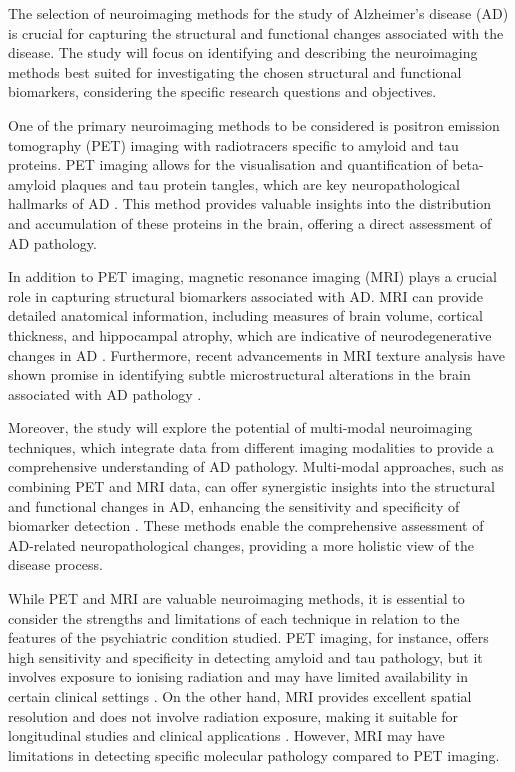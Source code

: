 \documentclass[10pt]{article}
\begin{document}
\begin{sloppypar}
  The selection of neuroimaging methods for the study of Alzheimer's disease (AD) is crucial for capturing the structural and functional changes associated with the disease. The study will focus on identifying and describing the neuroimaging methods best suited for investigating the chosen structural and functional biomarkers, considering the specific research questions and objectives.

  One of the primary neuroimaging methods to be considered is positron emission tomography (PET) imaging with radiotracers specific to amyloid and tau proteins. PET imaging allows for the visualisation and quantification of beta-amyloid plaques and tau protein tangles, which are key neuropathological hallmarks of AD \citep{jack_serial_2009}. This method provides valuable insights into the distribution and accumulation of these proteins in the brain, offering a direct assessment of AD pathology.

  In addition to PET imaging, magnetic resonance imaging (MRI) plays a crucial role in capturing structural biomarkers associated with AD. MRI can provide detailed anatomical information, including measures of brain volume, cortical thickness, and hippocampal atrophy, which are indicative of neurodegenerative changes in AD \citep{cai_magnetic_2020}. Furthermore, recent advancements in MRI texture analysis have shown promise in identifying subtle microstructural alterations in the brain associated with AD pathology \citep{cai_magnetic_2020}.

  Moreover, the study will explore the potential of multi-modal neuroimaging techniques, which integrate data from different imaging modalities to provide a comprehensive understanding of AD pathology. Multi-modal approaches, such as combining PET and MRI data, can offer synergistic insights into the structural and functional changes in AD, enhancing the sensitivity and specificity of biomarker detection \citep{ran_multimodal_2022}. These methods enable the comprehensive assessment of AD-related neuropathological changes, providing a more holistic view of the disease process.

  While PET and MRI are valuable neuroimaging methods, it is essential to consider the strengths and limitations of each technique in relation to the features of the psychiatric condition studied. PET imaging, for instance, offers high sensitivity and specificity in detecting amyloid and tau pathology, but it involves exposure to ionising radiation and may have limited availability in certain clinical settings \citep{bao_pet_2021}. On the other hand, MRI provides excellent spatial resolution and does not involve radiation exposure, making it suitable for longitudinal studies and clinical applications \citep{cai_magnetic_2020}. However, MRI may have limitations in detecting specific molecular pathology compared to PET imaging.


\end{sloppypar}
\end{document}
